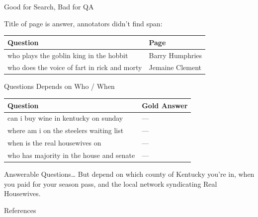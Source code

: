 \documentclass[xcolor=dvipsnames,xcolor=table]{beamer}
\begin{document}
\begin{frame}{Good for Search, Bad for QA}

  Title of page is answer, annotators didn't find span:
  \begin{tabular}{p{7cm}p{3cm}}
    \toprule
    Question & Page \\
    \hline
  who plays the goblin king in the hobbit &  Barry Humphries  \\
  who does the voice of fart in rick and morty & Jemaine Clement   \\
 \bottomrule
  \end{tabular}
\end{frame}

\begin{frame}{Questions Depends on Who / When}
  \begin{tabular}{p{8cm}p{2cm}}
    \toprule
    Question & Gold Answer \\
    \hline
    can i buy wine in kentucky on sunday & --- \\
    where am i on the steelers waiting list & --- \\
    when is the real housewives on & --- \\
    who has majority in the house and senate & --- \\
    \bottomrule
  \end{tabular}  

  \pause

  \begin{block}{Answerable Questions\dots}
  But depend on which county of Kentucky you're in,
  when you paid for your season pass, and the local network
  syndicating Real Housewives.
  \end{block}
  
\end{frame}


\begin{frame}{References}

\tiny

\end{frame}
\end{document}

